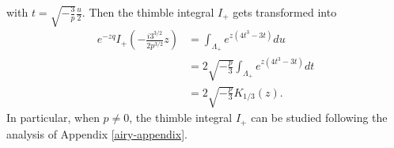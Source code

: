 \documentclass{article}
\newcommand{\laplace}{\mathcal{L}}
\theoremstyle{definition}
\theoremstyle{plain}
\newtheorem{lemma}[definition]{Lemma}
\begin{document}
with $t= \sqrt{-\frac{3}{p}} \frac{u}{2}$. Then the thimble integral $I_+$ gets transformed into 
\begin{align*}
    e^{-zq} I_+\left(-\tfrac{i 3^{3/2}}{2 p^{3/2}} z\right)&= \int_{\Lambda_+} e^{z (4t^3-3t)} du\\
    &= 2\sqrt{-\tfrac{p}{3}} \int_{\Lambda_+} e^{z (4t^3-3t)} dt \\
    &= 2\sqrt{-\tfrac{p}{3}} K_{1/3}(z). 
\end{align*}
In particular, when $p\neq 0$, the thimble integral $I_+$ can be studied following the analysis of Appendix \ref{airy-appendix}. 



\end{document}
